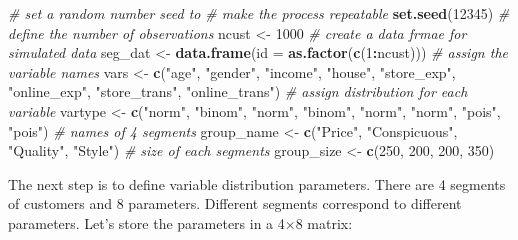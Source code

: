 \documentclass[12pt,]{krantz}
\makeatletter
\newenvironment{Shaded}{\begin{snugshade}}{\end{snugshade}}
\newcommand{\CommentTok}[1]{\textcolor[rgb]{0.37,0.37,0.37}{\textit{#1}}}
\newcommand{\DataTypeTok}[1]{\textcolor[rgb]{0.27,0.27,0.27}{#1}}
\newcommand{\DecValTok}[1]{\textcolor[rgb]{0.06,0.06,0.06}{#1}}
\newcommand{\KeywordTok}[1]{\textcolor[rgb]{0.27,0.27,0.27}{\textbf{#1}}}
\newcommand{\NormalTok}[1]{#1}
\newcommand{\OperatorTok}[1]{\textcolor[rgb]{0.43,0.43,0.43}{\textbf{#1}}}
\newcommand{\StringTok}[1]{\textcolor[rgb]{0.5,0.5,0.5}{#1}}
\newenvironment{kframe}{%
\medskip{}
\setlength{\fboxsep}{.8em}
 \def\at@end@of@kframe{}%
 \ifinner\ifhmode%
  \def\at@end@of@kframe{\end{minipage}}%
  \begin{minipage}{\columnwidth}%
 \fi\fi%
 \def\FrameCommand##1{\hskip\@totalleftmargin \hskip-\fboxsep
 \colorbox{shadecolor}{##1}\hskip-\fboxsep
     \hskip-\linewidth \hskip-\@totalleftmargin \hskip\columnwidth}%
 \MakeFramed {\advance\hsize-\width
   \@totalleftmargin\z@ \linewidth\hsize
   \@setminipage}}%
 {\par\unskip\endMakeFramed%
 \at@end@of@kframe}
\renewenvironment{Shaded}{\begin{kframe}}{\end{kframe}}
\makeatother
\begin{document}
\begin{Shaded}
\begin{Highlighting}[]
\CommentTok{# set a random number seed to }
\CommentTok{# make the process repeatable}
\KeywordTok{set.seed}\NormalTok{(}\DecValTok{12345}\NormalTok{)}
\CommentTok{# define the number of observations}
\NormalTok{ncust <-}\StringTok{ }\DecValTok{1000}
\CommentTok{# create a data frmae for simulated data}
\NormalTok{seg_dat <-}\StringTok{ }\KeywordTok{data.frame}\NormalTok{(}\DataTypeTok{id =} \KeywordTok{as.factor}\NormalTok{(}\KeywordTok{c}\NormalTok{(}\DecValTok{1}\OperatorTok{:}\NormalTok{ncust)))}
\CommentTok{# assign the variable names}
\NormalTok{vars <-}\StringTok{ }\KeywordTok{c}\NormalTok{(}\StringTok{"age"}\NormalTok{, }\StringTok{"gender"}\NormalTok{, }\StringTok{"income"}\NormalTok{, }\StringTok{"house"}\NormalTok{, }\StringTok{"store_exp"}\NormalTok{, }
    \StringTok{"online_exp"}\NormalTok{, }\StringTok{"store_trans"}\NormalTok{, }\StringTok{"online_trans"}\NormalTok{)}
\CommentTok{# assign distribution for each variable}
\NormalTok{vartype <-}\StringTok{ }\KeywordTok{c}\NormalTok{(}\StringTok{"norm"}\NormalTok{, }\StringTok{"binom"}\NormalTok{, }\StringTok{"norm"}\NormalTok{, }\StringTok{"binom"}\NormalTok{, }\StringTok{"norm"}\NormalTok{, }\StringTok{"norm"}\NormalTok{, }
    \StringTok{"pois"}\NormalTok{, }\StringTok{"pois"}\NormalTok{)}
\CommentTok{# names of 4 segments}
\NormalTok{group_name <-}\StringTok{ }\KeywordTok{c}\NormalTok{(}\StringTok{"Price"}\NormalTok{, }\StringTok{"Conspicuous"}\NormalTok{, }\StringTok{"Quality"}\NormalTok{, }\StringTok{"Style"}\NormalTok{)}
\CommentTok{# size of each segments}
\NormalTok{group_size <-}\StringTok{ }\KeywordTok{c}\NormalTok{(}\DecValTok{250}\NormalTok{, }\DecValTok{200}\NormalTok{, }\DecValTok{200}\NormalTok{, }\DecValTok{350}\NormalTok{)}
\end{Highlighting}
\end{Shaded}

The next step is to define variable distribution parameters. There are 4 segments of customers and 8 parameters. Different segments correspond to different parameters. Let's store the parameters in a 4×8 matrix:
\end{document}
